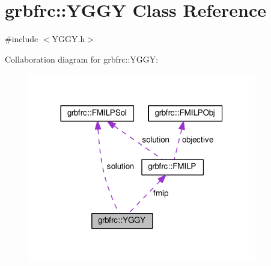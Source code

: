 \hypertarget{classgrbfrc_1_1YGGY}{}\section{grbfrc\+:\+:Y\+G\+GY Class Reference}
\label{classgrbfrc_1_1YGGY}


{\ttfamily \#include $<$Y\+G\+G\+Y.\+h$>$}



Collaboration diagram for grbfrc\+:\+:Y\+G\+GY\+:
\nopagebreak
\begin{figure}[H]
\begin{center}
\leavevmode
\includegraphics[width=282pt]{classgrbfrc_1_1YGGY__coll__graph}
\end{center}
\end{figure}
